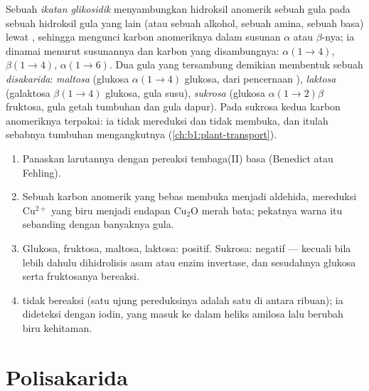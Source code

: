 \begin{definition}\label{def:b1:carbohydrates:glycosidic}
Sebuah \emph{ikatan glikosidik} menyambungkan
hidroksil anomerik sebuah gula pada sebuah hidroksil gula yang lain
(atau sebuah alkohol, sebuah amina, sebuah basa) lewat ,
sehingga mengunci karbon anomeriknya dalam susunan $\alpha$ atau
$\beta$-nya; ia dinamai menurut susunannya dan karbon yang disambungnya:
$\alpha(1{\to}4)$, $\beta(1{\to}4)$, $\alpha(1{\to}6)$. Dua gula yang
tersambung demikian membentuk sebuah
\emph{disakarida}: \emph{maltosa} (glukosa
$\alpha(1{\to}4)$ glukosa, dari pencernaan ), \emph{laktosa}
(galaktosa $\beta(1{\to}4)$ glukosa, gula susu), \emph{sukrosa}
(glukosa $\alpha(1{\to}2)\beta$ fruktosa, gula getah tumbuhan dan gula
dapur). Pada sukrosa kedua karbon anomeriknya terpakai: ia tidak
mereduksi dan tidak membuka, dan itulah sebabnya tumbuhan
mengangkutnya (\cref{ch:b1:plant-transport}).
\end{definition}

\begin{method}\label{met:b1:carbohydrates:reducing}
\begin{enumerate}
  \item Panaskan larutannya dengan pereaksi tembaga(II) basa (Benedict
        atau Fehling).
  \item Sebuah karbon anomerik yang bebas membuka menjadi aldehida,
        mereduksi $\mathrm{Cu^{2+}}$ yang biru menjadi endapan
        $\mathrm{Cu_2O}$ merah bata; pekatnya warna itu sebanding dengan
        banyaknya gula.
  \item Glukosa, fruktosa, maltosa, laktosa: positif. Sukrosa: negatif
        --- kecuali bila lebih dahulu dihidrolisis asam atau enzim
        invertase, dan sesudahnya glukosa serta fruktosanya bereaksi.
  \item {} tidak bereaksi (satu ujung pereduksinya adalah satu di
        antara ribuan); ia dideteksi dengan iodin, yang masuk ke dalam
        heliks amilosa lalu berubah biru kehitaman.
\end{enumerate}
\end{method}

\section{Polisakarida}

